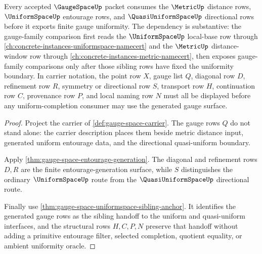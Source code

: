 \begin{theorem}
\label{thm:gauge-space-uniformity-dependency-route}
Every accepted $\GaugeSpaceUp$ packet consumes the $\MetricUp$ distance rows, $\UniformSpaceUp$ entourage rows, and $\QuasiUniformSpaceUp$ directional rows before it exports finite gauge uniformity. The dependency is substantive: the gauge-family comparison first reads the $\UniformSpaceUp$ local-base row through \autoref{ch:concrete-instances-uniformspace-namecert} and the $\MetricUp$ distance-window row through \autoref{ch:concrete-instances-metric-namecert}, then exposes gauge-family comparisons only after those sibling rows have fixed the uniformity boundary. In carrier notation, the point row $X$, gauge list $Q$, diagonal row $D$, refinement row $R$, symmetry or directional row $S$, transport row $H$, continuation row $C$, provenance row $P$, and local naming row $N$ must all be displayed before any uniform-completion consumer may use the generated gauge surface.
\end{theorem}
\begin{proof}
Project the carrier of \autoref{def:gauge-space-carrier}. The gauge rows $Q$ do not stand alone: the carrier description places them beside metric distance input, generated uniform entourage data, and the directional quasi-uniform boundary.

Apply \autoref{thm:gauge-space-entourage-generation}. The diagonal and refinement rows $D,R$ are the finite entourage-generation surface, while $S$ distinguishes the ordinary $\UniformSpaceUp$ route from the $\QuasiUniformSpaceUp$ directional route.

Finally use \autoref{thm:gauge-space-uniformspace-sibling-anchor}. It identifies the generated gauge rows as the sibling handoff to the uniform and quasi-uniform interfaces, and the structural rows $H,C,P,N$ preserve that handoff without adding a primitive entourage filter, selected completion, quotient equality, or ambient uniformity oracle.
\end{proof}
